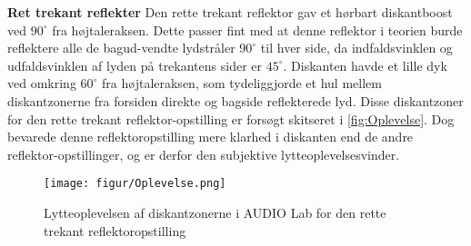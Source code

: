 \textbf{Ret trekant reflekter}\newline
Den rette trekant reflektor gav et hørbart diskantboost ved $90 ^{\circ}$ fra højtaleraksen. Dette passer fint med at denne reflektor i teorien burde reflektere alle de bagud-vendte lydstråler $90 ^{\circ}$ til hver side, da indfaldsvinklen og udfaldsvinklen af lyden på trekantens sider er $45 ^{\circ}$. Diskanten havde et lille dyk ved omkring $60 ^{\circ}$ fra højtaleraksen, som tydeliggjorde et hul mellem diskantzonerne fra forsiden direkte og bagside reflekterede lyd. Disse diskantzoner for den rette trekant reflektor-opstilling er forsøgt skitseret i \autoref{fig:Oplevelse}. Dog bevarede denne reflektoropstilling mere klarhed i diskanten end de andre reflektor-opstillinger, og er derfor den subjektive lytteoplevelsesvinder.

\begin{figure}[H] 
	\begin{center}
		\texttt{[image: figur/Oplevelse.png]}\quad
		\caption{Lytteoplevelsen af diskantzonerne i AUDIO Lab for den rette trekant reflektoropstilling}
		\label{fig:Oplevelse}
	\end{center}
\end{figure}

